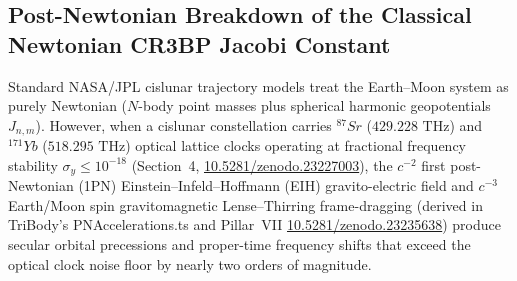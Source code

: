 \documentclass[11pt,a4paper,reqno]{article}
\def\texttt#1{#1}%
\def\mathrm#1{#1}%
\newcommand{\zenodo}[1]{\href{https://doi.org/10.5281/zenodo.#1}{\texttt{10.5281/\allowbreak zenodo.#1}}}
\theoremstyle{plain}
\theoremstyle{definition}
\theoremstyle{remark}
\numberwithin{equation}{section}
\begin{document}
\subsection{Post-Newtonian Breakdown of the Classical Newtonian CR3BP Jacobi Constant}
Standard NASA/JPL cislunar trajectory models treat the Earth--Moon system as purely Newtonian ($N$-body point masses plus spherical harmonic geopotentials $J_{n,m}$). However, when a cislunar constellation carries $^{87}\mathrm{Sr}$ ($429.228\text{ THz}$) and $^{171}\mathrm{Yb}$ ($518.295\text{ THz}$) optical lattice clocks operating at fractional frequency stability $\sigma_y \le 10^{-18}$ (Section~4, \zenodo{23227003}), the $c^{-2}$ first post-Newtonian (1PN) Einstein--Infeld--Hoffmann (EIH) gravito-electric field and $c^{-3}$ Earth/Moon spin gravitomagnetic Lense--Thirring frame-dragging (derived in TriBody's \texttt{PNAccelerations.ts} and Pillar~VII \zenodo{23235638}) produce secular orbital precessions and proper-time frequency shifts that exceed the optical clock noise floor by nearly two orders of magnitude.
\end{document}
